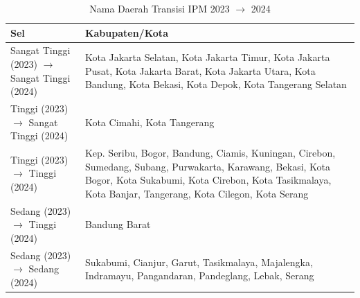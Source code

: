 \begin{table}[H]
\centering
\small
\caption{Nama Daerah Transisi IPM 2023 \(\rightarrow\) 2024} \label{tab:ipmname2023x2024}
\begin{tabular}{|>{\raggedright\arraybackslash}m{}|>{\raggedright\arraybackslash}m{}|}
\hline
\textbf{Sel} & \textbf{Kabupaten/Kota} \\
\hline
Sangat Tinggi (2023) \(\rightarrow\) Sangat Tinggi (2024) & Kota Jakarta Selatan, Kota Jakarta Timur, Kota Jakarta Pusat, Kota Jakarta Barat, Kota Jakarta Utara, Kota Bandung, Kota Bekasi, Kota Depok, Kota Tangerang Selatan \\
\hline
Tinggi (2023) \(\rightarrow\) Sangat Tinggi (2024) & Kota Cimahi, Kota Tangerang \\
\hline
Tinggi (2023) \(\rightarrow\) Tinggi (2024) & Kep. Seribu, Bogor, Bandung, Ciamis, Kuningan, Cirebon, Sumedang, Subang, Purwakarta, Karawang, Bekasi, Kota Bogor, Kota Sukabumi, Kota Cirebon, Kota Tasikmalaya, Kota Banjar, Tangerang, Kota Cilegon, Kota Serang \\
\hline
Sedang (2023) \(\rightarrow\) Tinggi (2024) & Bandung Barat \\
\hline
Sedang (2023) \(\rightarrow\) Sedang (2024) & Sukabumi, Cianjur, Garut, Tasikmalaya, Majalengka, Indramayu, Pangandaran, Pandeglang, Lebak, Serang \\
\hline
\end{tabular}
\end{table}
